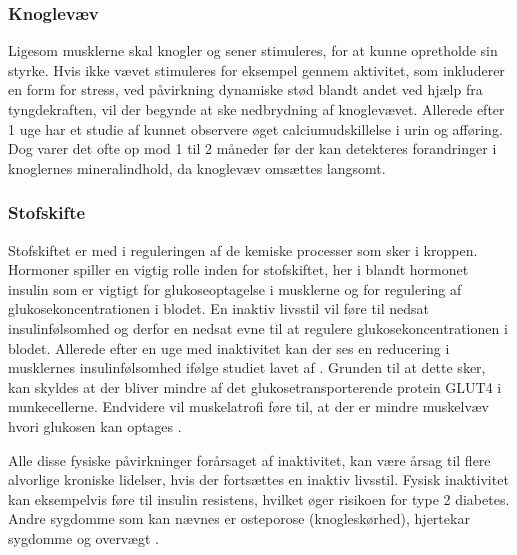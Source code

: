 \subsubsection{Knoglevæv}
Ligesom musklerne skal knogler og sener stimuleres, for at kunne opretholde sin styrke. 
Hvis ikke vævet stimuleres for eksempel gennem aktivitet, som inkluderer en form for stress, ved påvirkning dynamiske stød blandt andet ved hjælp fra tyngdekraften, vil der begynde at ske nedbrydning af knoglevævet. 
Allerede efter 1 uge har et studie af \citeauthor{Bloomfield1995} kunnet observere øget calciumudskillelse i urin og afføring. 
Dog varer det ofte op mod 1 til 2 måneder før der kan detekteres forandringer i knoglernes mineralindhold, da knoglevæv omsættes langsomt. \citep{Bloomfield1995}

\subsubsection{Stofskifte}
Stofskiftet er med i reguleringen af de kemiske processer som sker i kroppen. 
Hormoner spiller en vigtig rolle inden for stofskiftet, her i blandt hormonet insulin som er vigtigt for glukoseoptagelse i musklerne og for regulering af glukosekoncentrationen i blodet. 
En inaktiv livsstil vil føre til nedsat insulinfølsomhed og derfor en nedsat evne til at regulere glukosekoncentrationen i blodet. 
Allerede efter en uge med inaktivitet kan der ses en reducering i musklernes insulinfølsomhed ifølge studiet lavet af \citeauthor{Mikines1991}. 
Grunden til at dette sker, kan skyldes at der bliver mindre af det glukosetransporterende protein GLUT4 i munkecellerne. 
Endvidere vil muskelatrofi føre til, at der er mindre muskelvæv hvori glukosen kan optages \citep{Tabata1999}.

\noindent
Alle disse fysiske påvirkninger forårsaget af inaktivitet, kan være årsag til flere alvorlige kroniske lidelser, hvis der fortsættes en inaktiv livsstil. 
Fysisk inaktivitet kan eksempelvis føre til insulin resistens, hvilket øger risikoen for type 2 diabetes. 
Andre sygdomme som kan nævnes er osteporose (knogleskørhed), hjertekar sygdomme og overvægt \citep{motionsraad2007}.
